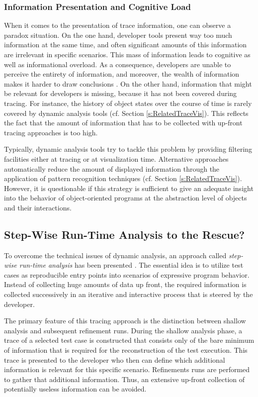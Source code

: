 \subsubsection{Information Presentation and Cognitive Load}
When it comes to the presentation of trace information, one can observe a paradox situation.
On the one hand, developer tools present way too much information at the same time, and often significant amounts of this information are irrelevant in specific scenarios.
This mass of information leads to cognitive as well as informational overload.
As a consequence, developers are unable to perceive the entirety of information, and moreover, the wealth of information makes it harder to draw conclusions \cite{hiltz_structuring_1985, sheridan_man-machine_1981}.
On the other hand, information that might be relevant for developers is missing, because it has not been covered during tracing.
For instance, the history of object states over the course of time is rarely covered by dynamic analysis tools (cf. Section \ref{s:RelatedTraceVis}).
This reflects the fact that the amount of information that has to be collected with up-front tracing approaches is too high.

Typically, dynamic analysis tools try to tackle this problem by providing filtering facilities either at tracing or at visualization time.
Alternative approaches automatically reduce the amount of displayed information through the application of pattern recognition techniques (cf. Section \ref{s:RelatedTraceVis}).
However, it is questionable if this strategy is sufficient to give an adequate insight into the behavior of object-oriented programs at the abstraction level of objects and their interactions.

\subsection{Step-Wise Run-Time Analysis to the Rescue?}
\label{ss:BackgroundTracing}
To overcome the technical issues of dynamic analysis, an approach called \emph{step-wise run-time analysis} has been presented \citep{perscheid_immediacy_2010, perscheid_test-driven_2013}.
The essential idea is to utilize test cases as reproducible entry points into scenarios of expressive program behavior.
Instead of collecting huge amounts of data up front, the required information is collected successively in an iterative and interactive process that is steered by the developer.

The primary feature of this tracing approach is the distinction between shallow analysis and subsequent refinement runs.
During the shallow analysis phase, a trace of a selected test case is constructed that consists only of the bare minimum of information that is required for the reconstruction of the test execution.
This trace is presented to the developer who then can define which additional information is relevant for this specific scenario.
Refinements runs are performed to gather that additional information.
Thus, an extensive up-front collection of potentially useless information can be avoided.

